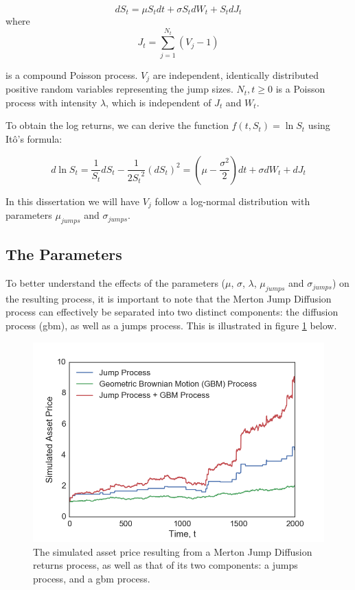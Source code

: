 \documentclass[11pt,oneside,openany,a4paper,english, report, goldenblock
]{usthesis}
\begin{document}
\begin{equation}
d S_t =  \mu S_t dt  +\sigma S_t dW_t + S_t dJ_t 
\end{equation}
where
\begin{equation}
J_t = \sum_{j=1}^{N_t}(V_j - 1)
\end{equation}

is a compound Poisson process. $V_j$ are independent, identically distributed positive random variables representing the jump sizes. $N_t, t \geq 0$ is a Poisson process with intensity $\lambda$, which is independent of $J_t$ and $W_t$.

To obtain the log returns, we can derive the function $f(t, S_t) = \ln{S_t}$ using It\^{o}'s formula:

\begin{equation} \label{equation:merton_log_returns}
d\ln{S_t} = \frac{1}{S_t}dS_t - \frac{1}{2{S_t}^2}\left(dS_t\right)^2 = \left( \mu - \frac{\sigma^2}{2} \right)dt +\sigma dW_t + dJ_t 
\end{equation}

In this dissertation we will have $V_j$ follow a log-normal distribution with parameters $\mu_{jumps}$ and $\sigma_{jumps}$.

\subsection{The Parameters}

To better understand the effects of the parameters ($\mu$, $\sigma$, $\lambda$, $\mu_{jumps}$ and $\sigma_{jumps}$) on the resulting process, it is important to note that the Merton Jump Diffusion process can effectively be separated into two distinct components: the diffusion process (\acrshort{gbm}), as well as a jumps process. This is illustrated in figure \ref{fig:merton_jd_components} below.

\begin{figure}[h]
	\centering
	\includegraphics[width=0.7\linewidth]{Images/Parameter-Effects/Merton_JD_Components}
	\caption[The components of a simulated path from the Merton Jump Diffusion process]{The simulated asset price resulting from a Merton Jump Diffusion returns process, as well as that of its two components: a jumps process, and a \acrshort{gbm} process.}
	\label{fig:merton_jd_components}
\end{figure}
\end{document}
